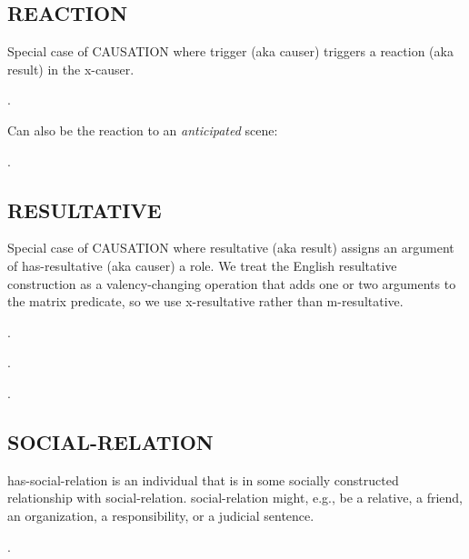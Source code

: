 \documentclass[a4paper]{article}
\newcommand{\fr}[1]{\textsf{#1}}
\newcommand{\rl}[1]{\textsf{#1}}
\begin{document}
\newpage\subsection{ \fr{REACTION}}
\label{sec:REACTION}

Special case of \fr{CAUSATION} where \rl{trigger} (aka \rl{causer}) triggers a
\rl{reaction} (aka \rl{result}) in the \rl{x-causer}.

\ex.

Can also be the reaction to an \emph{anticipated} scene:

\ex.


\newpage\subsection{ \fr{RESULTATIVE}}
\label{sec:RESULTATIVE}

Special case of \fr{CAUSATION} where \rl{resultative} (aka \rl{result}) assigns
an argument of \rl{has-resultative} (aka \rl{causer}) a role. We treat the
English resultative construction as a valency-changing operation that adds one
or two arguments to the matrix predicate, so we use \rl{x-resultative} rather
than \rl{m-resultative}.

\ex.

\ex.

\ex.


\newpage\subsection{ \fr{SOCIAL-RELATION}}
\label{sec:SOCIAL-RELATION}

\rl{has-social-relation} is an individual that is in some socially constructed
relationship with \rl{social-relation}. \rl{social-relation} might, e.g., be a
relative, a friend, an organization, a responsibility, or a judicial sentence.

\ex.
\end{document}
